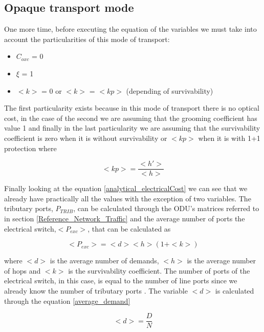 
\subsection{Opaque transport mode}\label{analytical_Opaque_Mode}

One more time, before executing the equation of the variables we must take into account the particularities of this mode of transport:
\begin{itemize}
  \item $C_{oxc}$ = 0
  \item $\xi$ = 1
  \item $<k>$ = 0 or $<k>$ = $<kp>$ (depending of survivability)
\end{itemize}

The first particularity exists because in this mode of transport there is no optical cost, in the case of the second we are assuming that the grooming coefficient has value 1 and finally in the last particularity we are assuming that the survivability coefficient is zero when it is without survivability or $<kp>$ when it is with 1+1 protection \cite{aulas} where

\begin{equation}
<kp> = \frac{<h'>}{<h>}
\label{coefficient_protec}
\end{equation}

\vspace{13pt}
Finally looking at the equation \ref{analytical_electricalCost} we can see that we already have practically all the values with the exception of two variables. The tributary ports, $P_{TRIB}$, can be calculated through the ODU's matrices referred to in section \ref{Reference_Network_Traffic} and the average number of ports the electrical switch,$<P_{exc}>$, that can be calculated as

\begin{equation}
<P_{exc}> = <d> <h> \left(1 + <k>\right)
\label{Pexc_opaque}
\end{equation}

\noindent
where $<d>$ is the average number of demands, $<h>$ is the average number of hops and $<k>$	is the survivability coefficient. The number of ports of the electrical switch, in this case, is equal to the number of line ports since we already know the number of tributary ports \cite{aulas}.
The variable $<d>$ is calculated through the equation \ref{average_demand}

\begin{equation}
<d> = \frac{D}{N}
\label{average_demand}
\end{equation}
